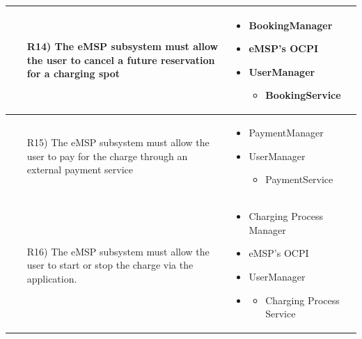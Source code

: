 \documentclass[table, 12pt]{article}
\begin{document}
\begin{longtable}{|p{}|p{}|}
    \begin{itemize}
        \item[R14)] The eMSP subsystem must allow the user to cancel a future reservation for a charging spot
    \end{itemize}
    &
    \begin{itemize}
        \item  BookingManager
        \item eMSP's OCPI
        \item UserManager
        \begin{itemize}\setlength{\itemindent}{-5px}
            \item BookingService
        \end{itemize}
    \end{itemize}
    \\\hline

    \begin{itemize}
        \item[R15)] The eMSP subsystem must allow the user to pay for the charge through an external payment service
    \end{itemize}
    &
    \begin{itemize}
        \item PaymentManager
        \item UserManager
        \begin{itemize}\setlength{\itemindent}{-5px}
            \item PaymentService
        \end{itemize} 
    \end{itemize}
    \\\hline

    \begin{itemize}
        \item[R16)] The eMSP subsystem must allow the user to start or stop the charge via the application. 
    \end{itemize}
    &
    \begin{itemize}
        \item Charging Process Manager
        \item eMSP's OCPI
        \item UserManager
        \item \begin{itemize}\setlength{\itemindent}{-5px}
            \item Charging Process Service
        \end{itemize}
    \end{itemize}
    \\\hline


\end{longtable}
\end{document}
